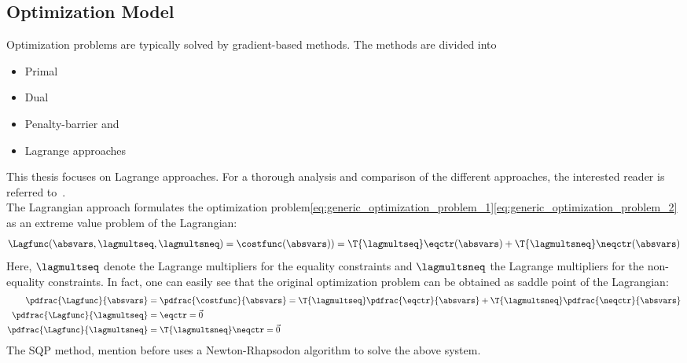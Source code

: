 \documentclass[../main.tex]{subfiles}
\begin{document}
\subsection{Optimization Model}\label{sec:optimization_model}
Optimization problems are typically solved by gradient-based methods. The methods are divided into
\begin{itemize}
\item Primal
\item Dual
\item Penalty-barrier   and
\item Lagrange approaches
\end{itemize}
This thesis focuses on Lagrange approaches. For a thorough analysis and comparison of the different approaches, the interested reader is referred to~\cite{Schittkowski1994}.\\
The Lagrangian approach formulates the optimization problem\eqref{eq:generic_optimization_problem_1}\eqref{eq:generic_optimization_problem_2} as an extreme value problem of the Lagrangian:
\begin{align}\label{eq:lagrangian_of_optimization}
\Lagfunc(\absvars,\lagmultseq,\lagmultsneq)=\costfunc(\absvars))=\T{\lagmultseq} \eqctr(\absvars) + \T{\lagmultsneq}\neqctr(\absvars) \\
\end{align}
Here, $\lagmultseq$ denote the Lagrange multipliers for the equality constraints and $\lagmultsneq$ the Lagrange multipliers for the non-equality constraints.
In fact, one can easily see that the original optimization problem can be obtained as saddle point of the Lagrangian:
\begin{align}\label{eq:saddlepoint_optimization}
\pdfrac{\Lagfunc}{\absvars}&=\pdfrac{\costfunc}{\absvars}=\T{\lagmultseq}\pdfrac{\eqctr}{\absvars}+\T{\lagmultsneq}\pdfrac{\neqctr}{\absvars} \\
\pdfrac{\Lagfunc}{\lagmultseq}&=\eqctr=\vec{0} \\
\pdfrac{\Lagfunc}{\lagmultsneq}&=\T{\lagmultsneq}\neqctr=\vec{0}
\end{align}
The \ac{SQP} method, mention before uses a Newton-Rhapsodon algorithm to solve the above system.



\def\incrabsvars{\Delta \absvars}
\def\incrlagmultsneq{\Delta \lagmultsneq}
\def\incrlagmultseq{\Delta \lagmultseq}

\def\PPLagfuncBYabsvars{\ppdfrac{\Lagfunc}{\absvars}}
\def\PLagfuncBYabsvars{\pdfrac{\Lagfunc}{\absvars}}
\def\PneqctrBYabsvars{\pdfrac{\neqctr}{\absvar}}
\def\PeqctrBYabsvars{\pdfrac{\eqctr}{\absvar}}
\end{document}
